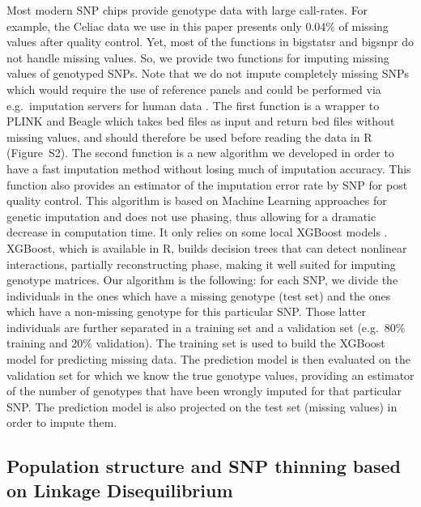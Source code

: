 \documentclass{bioinfo}
\begin{document}
\begin{methods}
Most modern SNP chips provide genotype data with large call-rates. For example, the Celiac data we use in this paper presents only 0.04\% of missing values after quality control. Yet, most of the functions in bigstatsr and bigsnpr do not handle missing values.
So, we provide two functions for imputing missing values of genotyped SNPs. Note that we do not impute completely missing SNPs which would require the use of reference panels and could be performed via e.g.\ imputation servers for human data \cite[]{mccarthy2016reference}. 
The first function is a wrapper to PLINK and Beagle \cite[]{Browning2009} which takes bed files as input and return bed files without missing values, and should therefore be used before reading the data in R (Figure~S2). 
The second function is a new algorithm we developed in order to have a fast imputation method without losing much of imputation accuracy. This function also provides an estimator of the imputation error rate by SNP for post quality control.
This algorithm is based on Machine Learning approaches for genetic imputation \cite[]{Wang2012} and does not use phasing, thus allowing for a dramatic decrease in computation time. It only relies on some local XGBoost models \cite[]{Chen2016}. 
XGBoost, which is available in R, builds decision trees that can detect nonlinear interactions, partially reconstructing phase, making it well suited for imputing genotype matrices. 
Our algorithm is the following: for each SNP, we divide the individuals in the ones which have a missing genotype (test set) and the ones which have a non-missing genotype for this particular SNP. Those latter individuals are further separated in a training set and a validation set (e.g.\ 80\% training and 20\% validation). The training set is used to build the XGBoost model for predicting missing data. The prediction model is then evaluated on the validation set for which we know the true genotype values, providing an estimator of the number of genotypes that have been wrongly imputed for that particular SNP. The prediction model is also projected on the test set (missing values) in order to impute them.


\subsection{Population structure and SNP thinning based on Linkage Disequilibrium} 




\end{methods}
\end{document}
